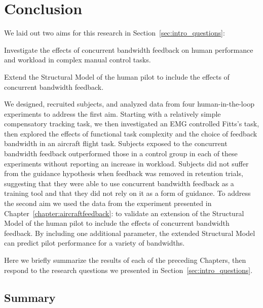\chapter{Conclusion}
\label{chap:conclusion}

We laid out two aims for this research in Section~\ref{sec:intro_questions}:
\begin{description}[align=left]
    \item [Aim One] Investigate the effects of concurrent bandwidth feedback on human performance and workload in complex manual control tasks.
    \item [Aim Two] Extend the Structural Model of the human pilot to include the effects of concurrent bandwidth feedback.
\end{description}

We designed, recruited subjects, and analyzed data from four human-in-the-loop experiments to address the first aim.
Starting with a relatively simple compensatory tracking task, we then investigated an EMG controlled Fitts's task, then explored the effects of functional task complexity and the choice of feedback bandwidth in an aircraft flight task.
Subjects exposed to the concurrent bandwidth feedback outperformed those in a control group in each of these experiments without reporting an increase in workload.
Subjects did not suffer from the guidance hypothesis when feedback was removed in retention trials, suggesting that they were able to use concurrent bandwidth feedback as a training tool and that they did not rely on it as a form of guidance.
To address the second aim we used the data from the experiment presented in Chapter~\ref{chapter:aircraftfeedback}:  to validate an extension of the Structural Model of the human pilot to include the effects of concurrent bandwidth feedback.
By including one additional parameter, the extended Structural Model can predict pilot performance for a variety of bandwidths.

Here we briefly summarize the results of each of the preceding Chapters, then respond to the research questions we presented in Section~\ref{sec:intro_questions}.

\section{Summary}


